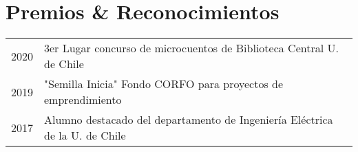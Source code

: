 \section{Premios \& Reconocimientos \faTrophy}
\begin{tabular}{r l}
2020 &  3er Lugar concurso de microcuentos de Biblioteca Central U. de Chile\\
2019 & "Semilla Inicia" Fondo CORFO para proyectos de emprendimiento\\
2017 &  Alumno destacado del departamento de Ingeniería Eléctrica de la U. de Chile
\end{tabular}
\sectionsep